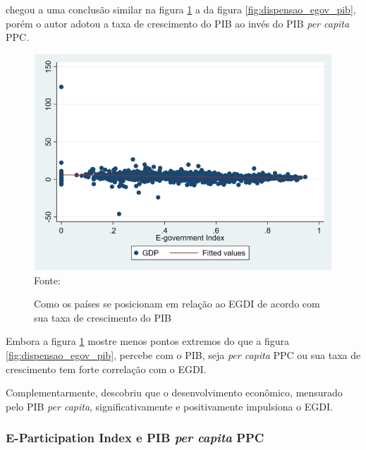 \cite{alisherovna2021whether} chegou a uma conclusão similar na figura \ref{fig:usmanova_egdi_gdp} a da figura \ref{fig:dispensao_egov_pib}, porém o autor adotou a taxa de crescimento do PIB ao invés do PIB \textit{per capita} PPC.

\begin{figure}[H]
	\centering
	\caption{Como os países se posicionam em relação ao EGDI de acordo com sua taxa de crescimento do PIB}
	\includegraphics[width=1\linewidth]{figuras/egdi/usmanova_egdi_gdp}
	\label{fig:usmanova_egdi_gdp}
	\footnotesize{Fonte: \cite{alisherovna2021whether}}
\end{figure}

Embora a figura \ref{fig:usmanova_egdi_gdp} mostre menos pontos extremos do que a figura \ref{fig:dispensao_egov_pib}, percebe com o PIB, seja \textit{per capita} PPC ou sua taxa de crescimento tem forte correlação com o EGDI. 

Complementarmente, \cite{kumar2020cultural} descobriu que o desenvolvimento econômico, mensurado pelo PIB \textit{per capita}, significativamente e positivamente impulsiona o EGDI. 

\subsubsection{E-Participation Index e PIB \textit{per capita} PPC}

